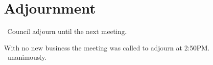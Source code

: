 \section*{Adjournment}

\begin{motion}
    \birt\ Council adjourn until the next meeting.
    \movers{\seneca}{\tristan}

    With no new business the meeting was called to adjourn at 2:50PM.%
    \carries\ unanimously.
\end{motion}

